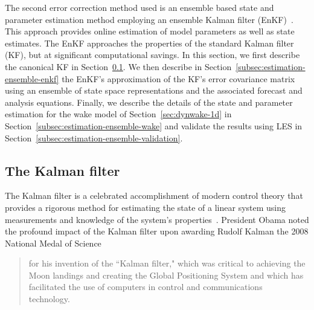 The second error correction method used is an ensemble based state and parameter estimation method employing an ensemble Kalman filter (EnKF)~\cite{Evensen2003a}. This approach provides online estimation of model parameters as well as state estimates. The EnKF approaches the properties of the standard Kalman filter (KF), but at significant computational savings. In this section, we first describe the canonical KF in Section~\ref{subsec:estimation-ensemble-kalman}. We then describe in Section~\ref{subsec:estimation-ensemble-enkf} the EnKF's approximation of the KF's error covariance matrix using an ensemble of state space representations and the associated forecast and analysis equations. Finally, we describe the details of the state and parameter estimation for the wake model of Section~\ref{sec:dynwake-1d} in Section~\ref{subsec:estimation-ensemble-wake} and validate the results using LES in Section~\ref{subsec:estimation-ensemble-validation}.

\subsection{The Kalman filter}
\label{subsec:estimation-ensemble-kalman}

The Kalman filter is a celebrated accomplishment of modern control theory that provides a rigorous method for estimating the state of a linear system using measurements and knowledge of the system's properties~\cite{Kalman1960a, Gelb1974a}. President Obama noted the profound impact of the Kalman filter upon awarding Rudolf Kalman the 2008 National Medal of Science 

\begin{quote}
for his invention of the ``Kalman filter," which was critical to achieving the Moon landings and creating the Global Positioning System and which has facilitated the use of computers in control and communications technology.~\cite{Obama2009a}
\end{quote}

